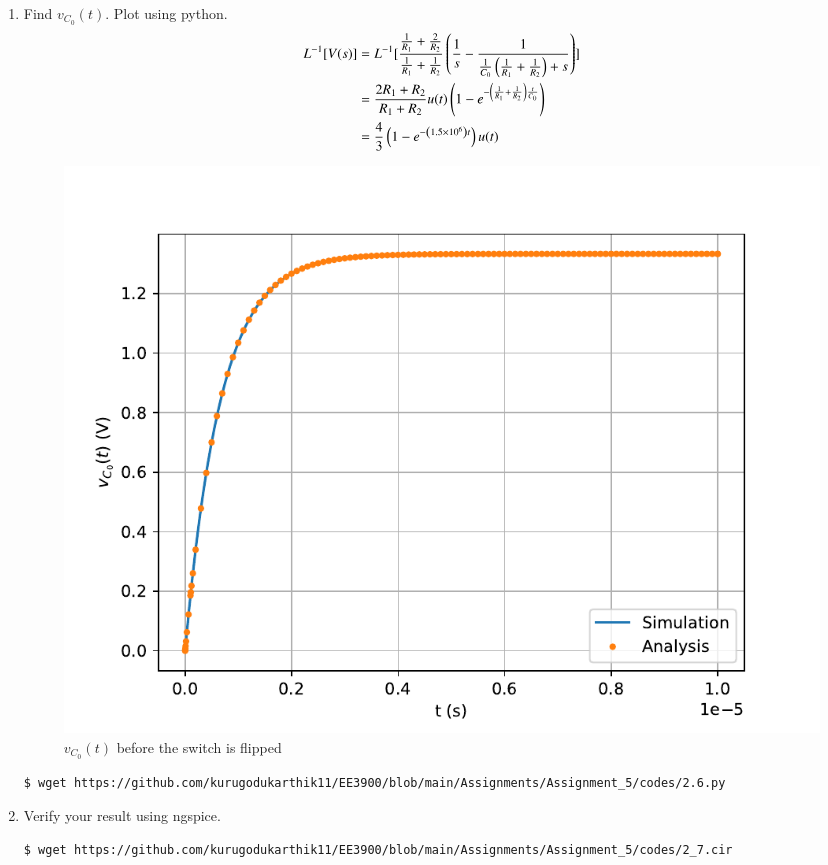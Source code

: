 \documentclass[journal,12pt,twocolumn]{IEEEtran}
\renewcommand\thesection{\arabic{section}}
\begin{document}
\begin{enumerate}[label=\arabic*.,ref=\thesection.\theenumi]
\item Find $v_{C_0}(t)$.  Plot using python. \\
\solution
\begin{align}
L^{-1}[V(s)]&=L^{-1}[\frac{\frac{1}{R_1} + \frac{2}{R_2}}{\frac{1}{R_1} + \frac{1}{R_2}}\left(\frac{1}{s} - \frac{1}{\frac{1}{C_0}\left(\frac{1}{R_1} + \frac{1}{R_2}\right) + s}\right)] \\
&=\frac{2R_1 + R_2}{R_1 + R_2}u(t)\left(1 - e^{-\left(\frac{1}{R_1} + \frac{1}{R_2}\right)\frac{t}{C_0}}\right) \\
&=\frac{4}{3}\left(1 - e^{-\left(1.5 \times 10^6\right)t}\right)u(t)
\end{align}
\begin{figure}[!ht]
\centering
\includegraphics[width=\columnwidth]{figs/2_6.pdf}
\caption{$v_{C_0}(t)$ before the switch is flipped}
\label{fig:v1-t}
\end{figure}
\begin{lstlisting}
$ wget https://github.com/kurugodukarthik11/EE3900/blob/main/Assignments/Assignment_5/codes/2.6.py
\end{lstlisting}
\item Verify your result using ngspice.
\solution
\begin{lstlisting}
$ wget https://github.com/kurugodukarthik11/EE3900/blob/main/Assignments/Assignment_5/codes/2_7.cir
\end{lstlisting}
\end{enumerate}
\end{document}
